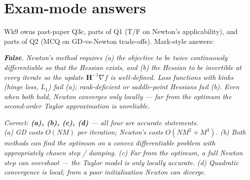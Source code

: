 \documentclass[11pt, a4paper]{article}
\begin{document}
\section{Exam-mode answers}

Wk9 owns past-paper Q3c, parts of Q1 (T/F on Newton's applicability), and parts of Q2 (MCQ on GD-vs-Newton trade-offs). Mark-style answers:

\begin{exambox}
\textit{\textbf{False}. Newton's method requires (a) the objective to be twice continuously differentiable so that the Hessian exists, and (b) the Hessian to be invertible at every iterate so the update $\mathbf{H}^{-1}\nabla f$ is well-defined. Loss functions with kinks (hinge loss, $L_1$) fail (a); rank-deficient or saddle-point Hessians fail (b). Even when both hold, Newton converges only locally — far from the optimum the second-order Taylor approximation is unreliable.}
\end{exambox}

\begin{exambox}
\textit{Correct: \textbf{(a), (b), (c), (d)} — all four are accurate statements.}\\[0.3em]
\textit{(a) GD costs $O(NM)$ per iteration; Newton's costs $O(NM^2 + M^3)$. (b) Both methods can find the optimum on a convex differentiable problem with appropriately chosen step / damping. (c) Far from the optimum, a full Newton step can overshoot — the Taylor model is only locally accurate. (d) Quadratic convergence is local; from a poor initialisation Newton can diverge.}
\end{exambox}
\end{document}

